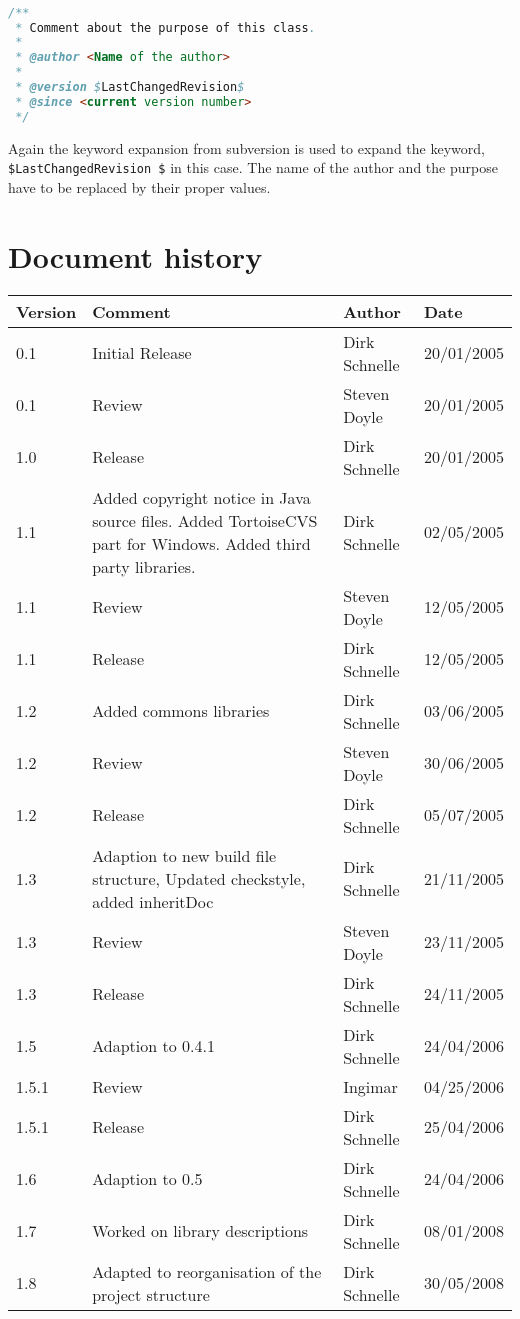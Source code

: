 \documentclass[11pt,a4paper]{article}
\begin{document}
\begin{lstlisting}[language=Java]

/**
 * Comment about the purpose of this class.
 *
 * @author <Name of the author>
 *
 * @version $LastChangedRevision$
 * @since <current version number>
 */
\end{lstlisting}

Again the keyword expansion from subversion is used to expand the keyword,
\texttt{\$LastChangedRevision \$} in this case. The name of the author and the 
purpose have to be replaced by their proper values.

\section*{Document history}

\begin{tabular}{|l|p{5cm}|l|l|}
\hline
\textbf{Version} & \textbf{Comment} & \textbf{Author} & \textbf{Date} \\
\hline
\hline
0.1 & Initial Release & Dirk Schnelle & 20/01/2005 \\
\hline
0.1 & Review & Steven Doyle & 20/01/2005 \\
\hline
1.0 & Release & Dirk Schnelle & 20/01/2005 \\
\hline
1.1 & Added copyright notice in Java source files.
Added TortoiseCVS part for Windows.
Added third party libraries. & Dirk Schnelle & 
 02/05/2005 \\
\hline
1.1 & Review & Steven Doyle & 12/05/2005 \\
\hline
1.1 & Release & Dirk Schnelle & 12/05/2005 \\
\hline
1.2 & Added commons libraries & Dirk Schnelle & 03/06/2005 \\
\hline
1.2 & Review & Steven Doyle & 30/06/2005 \\
\hline
1.2 & Release & Dirk Schnelle & 05/07/2005 \\
\hline
1.3 & Adaption to new build file structure, Updated checkstyle, added 
inheritDoc & Dirk Schnelle & 21/11/2005 \\
\hline
1.3 & Review & Steven Doyle & 23/11/2005 \\
\hline
1.3 & Release & Dirk Schnelle & 24/11/2005 \\
\hline
1.5 & Adaption to 0.4.1  & Dirk Schnelle & 24/04/2006 \\
\hline
1.5.1 & Review & Ingimar  & 04/25/2006 \\
\hline
1.5.1 & Release  & Dirk Schnelle & 25/04/2006 \\
\hline
1.6 & Adaption to 0.5  & Dirk Schnelle & 24/04/2006 \\
\hline
1.7 & Worked on library descriptions  & Dirk Schnelle & 08/01/2008 \\
\hline
1.8 & Adapted to reorganisation of the project structure & Dirk Schnelle &
30/05/2008 \\
\hline
\end{tabular}




\end{document}
